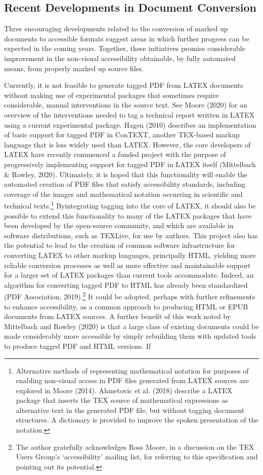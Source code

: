 \documentclass[11pt]{sig-alternate}
\begin{document}
\begin{large}
\subsection*{Recent Developments in Document Conversion}
Three encouraging developments related to the conversion of marked up documents to accessible formats suggest areas in which further progress can be expected in the coming years. Together, these initiatives promise considerable improvement in the non-visual accessibility obtainable, by fully automated means, from properly marked up source files. 

Currently, it is not feasible to generate tagged PDF from LATEX documents without making use of experimental packages that sometimes require considerable, manual interventions in the source text. See Moore (2020) for an overview of the interventions needed to tag a technical report written in LATEX using a current experimental package. Hagen (2010) describes an implementation of basic support for tagged PDF in ConTEXT, another TEX-based markup language that is less widely used than LATEX. However, the core developers of LATEX have recently commenced a funded project with the purpose of progressively implementing support for tagged PDF in LATEX itself (Mittelbach \& Rowley, 2020). Ultimately, it is hoped that this functionality will enable the automated creation of PDF files that satisfy accessibility standards, including coverage of the images and mathematical notation occurring in scientific and technical texts.\footnote{Alternative methods of representing mathematical notation for purposes of enabling non-visual access in PDF files generated from LATEX sources are explored in Moore (2014). Ahmetovic et al. (2018) describe a LATEX package that inserts the TEX source of mathematical expressions as alternative text in the generated PDF file, but without tagging document structures. A dictionary is provided to improve the spoken presentation of the notation.} Byintegrating tagging into the core of LATEX, it should also be possible to extend this functionality to many of the LATEX packages that have been developed by the open-source community, and which are available in software distributions, such as TEXLive, for use by authors. This project also has the potential to lead to the creation of common software infrastructure for converting LATEX to other markup languages, principally HTML, yielding more reliable conversion processes as well as more effective and maintainable support for a larger set of LATEX packages than current tools accommodate. Indeed, an algorithm for converting tagged PDF to HTML has already been standardized (PDF Association, 2019).\footnote{The author gratefully acknowledges Ross Moore, in a discussion on the TEX Users Group’s ‘accessibility’ mailing list, for referring to this specification and pointing out its potential.} It could be adopted, perhaps with further refinements to enhance accessibility, as a common approach to producing HTML or EPUB documents from LATEX sources. A further benefit of this work noted by Mittelbach and Rowley (2020) is that a large class of existing documents could be made considerably more accessible by simply rebuilding them with updated tools to produce tagged PDF and HTML versions. If 
\end{large}
\end{document}
